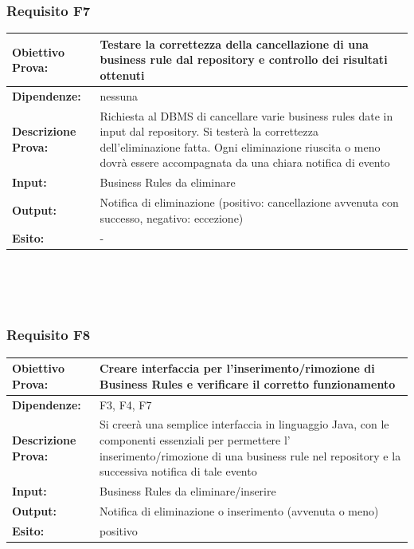 \documentclass[11pt,titlepage,a4paper]{report}
\begin{document}
\subsubsection{Requisito F7}
\begin{tabular}{||p{4.5cm}||p{7.5cm}||}
\hline
{\textbf {Obiettivo Prova:}}& Testare la correttezza della cancellazione di una business rule dal repository e controllo dei risultati ottenuti\\ \hline
{\textbf{Dipendenze:}}& nessuna \\ \hline
{\textbf{Descrizione Prova:}}&  Richiesta al DBMS di cancellare varie business rules date in input dal repository. Si tester\`a la correttezza dell'eliminazione fatta. Ogni eliminazione riuscita o meno dovr\`a essere accompagnata da una chiara notifica di evento\\ \hline
{\textbf{Input:}}& Business Rules da eliminare \\ \hline
{\textbf{Output:}}& Notifica di eliminazione (positivo: cancellazione avvenuta con successo, negativo: eccezione) \\ \hline
{\textbf{Esito:}}& - \\ \hline
\end{tabular} \\
\\
\\
\subsubsection{Requisito F8}
\begin{tabular}{||p{4.5cm}||p{7.5cm}||}
\hline
{\textbf {Obiettivo Prova:}}& Creare interfaccia per l'inserimento/rimozione di Business Rules e verificare il corretto funzionamento\\ \hline
{\textbf{Dipendenze:}}& F3, F4, F7 \\ \hline
{\textbf{Descrizione Prova:}}& Si creer\`a  una semplice interfaccia in linguaggio Java, con le componenti essenziali per permettere l' inserimento/rimozione di una business rule nel repository e la successiva notifica di tale evento \\ \hline
{\textbf{Input:}}& Business Rules da eliminare/inserire \\ \hline
{\textbf{Output:}}& Notifica di eliminazione o inserimento (avvenuta o meno) \\ \hline
{\textbf{Esito:}}& positivo\\ \hline
\end{tabular} \\
\\
\\
\end{document}
